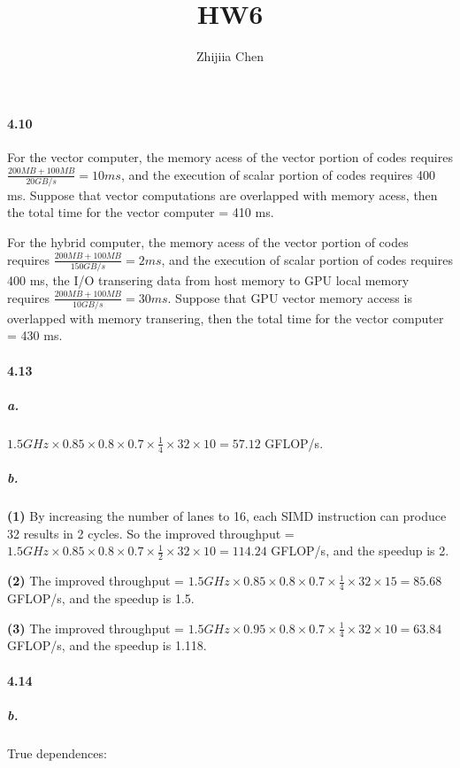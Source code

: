 \documentclass{article}
\title{HW6}
\author{Zhijiia Chen}
\begin{document}
\maketitle

\paragraph{4.10} For the vector computer, the memory acess of the vector portion of codes requires $\frac{200 MB+100 MB}{20 GB/s}=10 ms$, and the execution of scalar portion of codes requires 400 ms. Suppose that vector computations are overlapped with memory acess, then the total time for the vector computer = 410 ms.

For the hybrid computer, the memory acess of the vector portion of codes requires $\frac{200 MB+100 MB}{150 GB/s}=2 ms$, and the execution of scalar portion of codes requires 400 ms, the I/O transering data from host memory to GPU local memory requires $\frac{200 MB+100 MB}{10 GB/s}=30 ms$. Suppose that GPU vector memory access is overlapped with memory transering, then the total time for the vector computer = 430 ms.

\paragraph{4.13} 

\subparagraph{a.} $1.5 GHz\times 0.85\times 0.8\times 0.7\times \frac{1}{4}\times 32\times 10 = 57.12$ GFLOP/s.

\subparagraph{b.}
\textbf{(1)} By increasing the number of lanes to 16, each SIMD instruction can produce 32 results in 2 cycles. So the improved throughput = $1.5 GHz\times 0.85\times 0.8\times 0.7\times \frac{1}{2}\times 32\times 10 = 114.24$ GFLOP/s, and the speedup is 2.

\textbf{(2)} The improved throughput = $1.5 GHz\times 0.85\times 0.8\times 0.7\times \frac{1}{4}\times 32\times 15 = 85.68$ GFLOP/s, and the speedup is 1.5.

\textbf{(3)} The improved throughput = $1.5 GHz\times 0.95\times 0.8\times 0.7\times \frac{1}{4}\times 32\times 10 = 63.84$ GFLOP/s, and the speedup is 1.118.

\paragraph{4.14}

\subparagraph{b.}

True dependences: 
\end{document}
